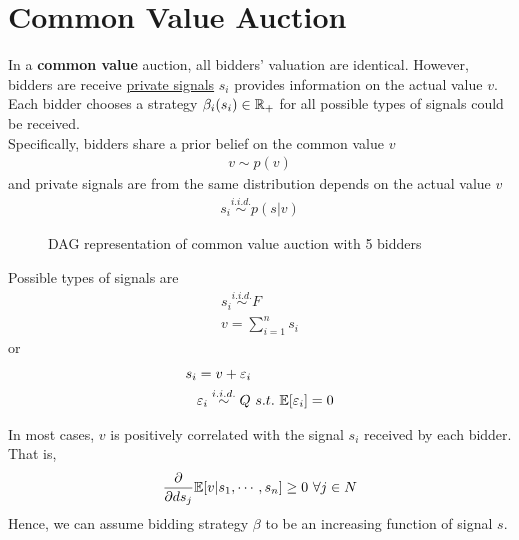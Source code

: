 \documentclass{article}
\begin{document}
	\section{Common Value Auction}
	\begin{definition}
		In a \textbf{common value} auction, all bidders' valuation are identical. However, bidders are receive \ul{private signals} $s_i$ provides information on the actual value $v$. Each bidder chooses a strategy $\beta_i(s_i) \in \mathbb{R}_+$ for all possible types of signals could be received. \\
		Specifically, bidders share a prior belief on the common value $v$ 
		\begin{align}
			v \sim p(v)	
		\end{align}
		and private signals are from the same distribution depends on the actual value $v$
		\begin{align}
			s_i \overset{i.i.d.}{\sim} p(s|v)
		\end{align}
	\end{definition}
	
	\begin{figure}[H]
		\centering
		\caption{DAG representation of common value auction with 5 bidders}
	\end{figure}

	\begin{example}
		Possible types of signals are
		\begin{align}
			s_i \overset{i.i.d.}{\sim} F\\ v = \sum_{i=1}^n s_i
		\end{align}
		or 
		\begin{align}
			s_i &= v + \varepsilon_i \\
			&\varepsilon_i \overset{i.i.d.}{\sim} Q\ s.t.\ \expect{\varepsilon_i} = 0
		\end{align}
	\end{example}
	\par In most cases, $v$ is positively correlated with the signal $s_i$ received by each bidder. That is,
	\begin{align}
		\frac{\partial{}}{\partial{d s_j}} \mathbb{E}[{v|s_1, \cdots, s_n}] \geq 0\ \forall j \in N
	\end{align}
	Hence, we can assume bidding strategy $\beta$ to be an increasing function of signal $s$.
	
\end{document}
